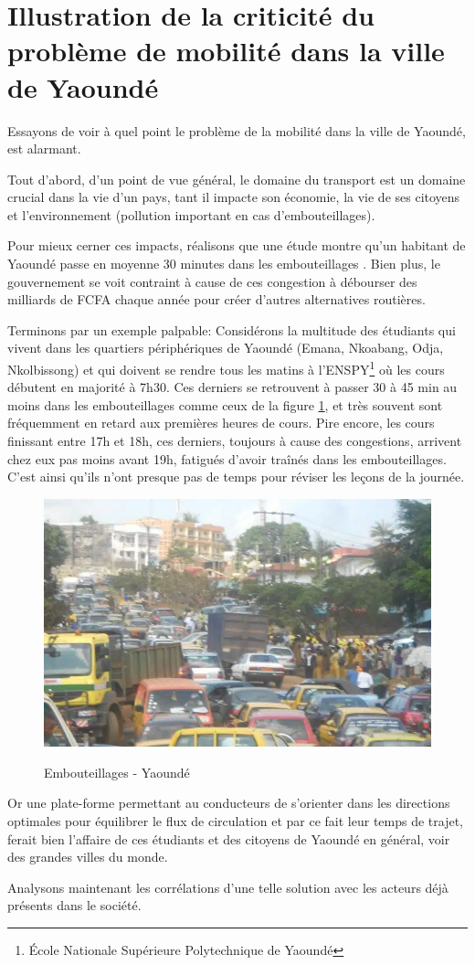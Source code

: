 \section{Illustration de la criticité du problème de mobilité dans la ville de Yaoundé}

Essayons de voir à quel point le problème de la mobilité dans la ville de Yaoundé, est alarmant.

Tout d'abord, d'un point de vue général, le domaine du transport est un domaine crucial dans la vie d'un pays, tant il impacte son économie, la vie de ses citoyens et l'environnement (pollution important en cas d'embouteillages). 

Pour mieux cerner ces impacts, réalisons que une étude montre qu'un habitant de Yaoundé passe en moyenne 30 minutes dans les embouteillages \cite{mfoulou2016mobilite}. Bien plus, le gouvernement se voit contraint à cause de ces congestion à débourser des milliards de FCFA chaque année pour créer d'autres alternatives routières.\cite{237online2022contournement}

Terminons par un exemple palpable: Considérons la multitude des étudiants qui vivent dans les quartiers périphériques de Yaoundé (Emana, Nkoabang, Odja, Nkolbissong) et qui doivent se rendre tous les matins à l'ENSPY\footnote{École Nationale Supérieure Polytechnique de Yaoundé} où les cours débutent en majorité à 7h30. Ces derniers se retrouvent à passer 30 à 45 min au moins dans les embouteillages comme ceux de la figure \ref{fig:embouteillage}, et très souvent sont fréquemment en retard aux premières heures de cours. Pire encore, les cours finissant entre 17h et 18h, ces derniers, toujours à cause des congestions, arrivent chez eux pas moins avant 19h, fatigués d'avoir traînés dans les embouteillages. C'est ainsi qu'ils n'ont presque pas de temps pour réviser les leçons de la journée.

\begin{figure}[h]
    \centering
    \includegraphics[width=0.5\linewidth]{Images/Embouteillage.png}
    \caption{Embouteillages - Yaoundé}
    \label{fig:embouteillage}
    \cite{camerounCirculation}
\end{figure}

Or une plate-forme permettant au conducteurs de s'orienter dans les directions optimales pour équilibrer le flux de circulation et par ce fait leur temps de trajet, ferait bien l'affaire de ces étudiants et des citoyens de Yaoundé en général, voir des grandes villes du monde.

Analysons maintenant les corrélations d'une telle solution avec les acteurs déjà présents dans le société.
